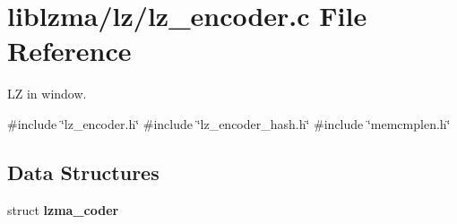 \section{liblzma/lz/lz\+\_\+encoder.c File Reference}
\label{lz__encoder_8c}


LZ in window.  


{\ttfamily \#include \char`\"{}lz\+\_\+encoder.\+h\char`\"{}}\newline
{\ttfamily \#include \char`\"{}lz\+\_\+encoder\+\_\+hash.\+h\char`\"{}}\newline
{\ttfamily \#include \char`\"{}memcmplen.\+h\char`\"{}}\newline
\subsection*{Data Structures}
\begin{DoxyCompactItemize}
\item 
struct \textbf{ lzma\+\_\+coder}
\end{DoxyCompactItemize}
